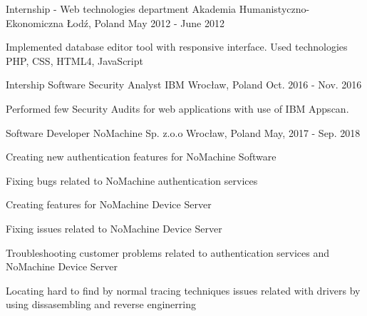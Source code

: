 

\begin{cventries}

  \cventry
    {Internship - Web technologies department} %
    {Akademia Humanistyczno-Ekonomiczna} %
    {Łodź, Poland} %
    {May 2012 - June 2012} %
    {
      \begin{cvitems} %
        \item {Implemented database editor tool with responsive interface. Used technologies PHP, CSS, HTML4, JavaScript} 
      \end{cvitems}
    }

  \cventry
    {Intership Software Security Analyst} %
    {IBM} %
    {Wrocław, Poland} %
    {Oct. 2016 - Nov. 2016} %
    {
      \begin{cvitems} %
        \item {Performed few Security Audits for web applications with use of IBM Appscan.}
      \end{cvitems}
    }

  \cventry
    {Software Developer} %
    {NoMachine Sp. z.o.o} %
    {Wrocław, Poland} %
    {May, 2017 - Sep. 2018} %
    {
      \begin{cvitems} %
        \item {Creating new authentication features for NoMachine Software}
        \item {Fixing bugs related to NoMachine authentication services}
        \item {Creating features for NoMachine Device Server}
        \item {Fixing issues related to NoMachine Device Server}
        \item {Troubleshooting customer problems related to authentication services and NoMachine Device Server}
        \item {Locating hard to find by normal tracing techniques issues related with drivers by using dissasembling and reverse enginerring}
      \end{cvitems}
    }


\end{cventries}
